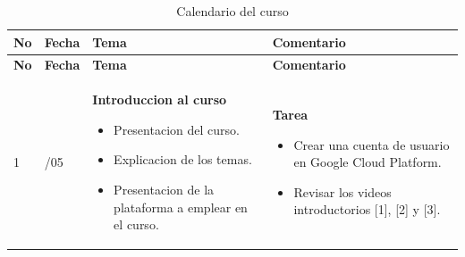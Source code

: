 \documentclass[
  coursetitle={Cómputo Nube y Tecnologías Emergentes},
  coursehours={96},
  coursedate={Verano 2026},
  doctype={Guía del curso},
  otherlangs={english,french},
  authorname={Lázaro},
  authorsurname={Bustio-Martínez},
  authortitle={PhD},
  role={Profesor Investigador},
  email={lbustio@inaoe.mx},
  phone={5559504000},
  ext={7459},
  institution={Instituto Nacional de Astrofísica, Óptica y Electrónica (INAOE)},
  department={Maestría en Ciencias en Tecnologías de Seguridad},
  address={Luis Enrique Erro 1, Sta. Ma. Tonantzintla, San Andrés Cholula, CP 72840, Puebla, México},
  margin={0.5in}
]{../../lbustio_lecture_notes}
\begin{document}
\setlength{\LTleft}{0pt}
\setlength{\LTright}{0pt}
\begin{longtable}{|
  >{\centering\arraybackslash}p{}|
  >{\centering\arraybackslash}p{}|
  >{\raggedright\arraybackslash}p{}|
  >{\raggedright\arraybackslash}p{}|}
\caption{Calendario del curso}
\label{tab:calendario-curso}
\\
\hline
\textbf{No} & \textbf{Fecha} & \textbf{Tema} & \textbf{Comentario} \\
\hline
\endfirsthead

\hline
\textbf{No} & \textbf{Fecha} & \textbf{Tema} & \textbf{Comentario} \\
\hline
\endhead

\hline
\endfoot

1 & 11/05 & \textbf{Introduccion al curso}
            \begin{itemize}
              \item Presentacion del curso.
              \item Explicacion de los temas.
              \item Presentacion de la plataforma a emplear en el curso.
            \end{itemize}
&
\textbf{Tarea}
\begin{itemize}
  \item Crear una cuenta de usuario en Google Cloud Platform.
  \item Revisar los videos introductorios [1], [2] y [3].
\end{itemize}
\\
\hline


\end{longtable}
\end{document}
